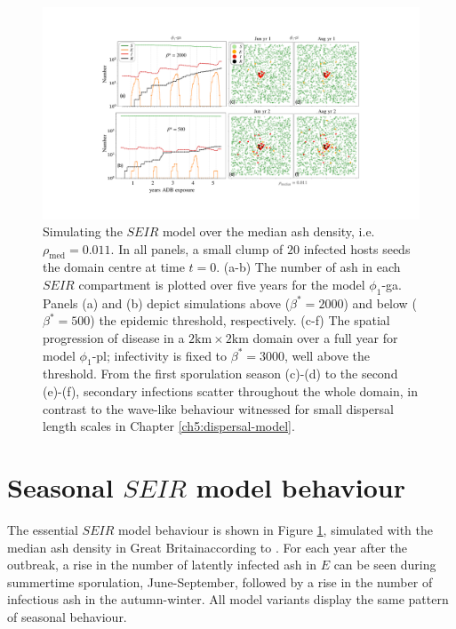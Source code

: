 \begin{landscape}
\begin{figure}
    \centering
    \includegraphics[scale=0.45]{chapter6/figures/fig4-seir.pdf} %
     \caption{Simulating the $SEIR$ model over the median ash density, i.e. $\rho_{\mathrm{med}} = 0.011$. 
     In all panels, a small clump of $20$ infected hosts seeds the domain centre at time $t=0$.
     (a-b) The number of ash in each $SEIR$ compartment is plotted over five years for the model $\phi_1$-ga.
     Panels (a) and (b) depict simulations above ($\beta^*=2000$) and below ($\beta^*=500$) the epidemic threshold, respectively. 
     (c-f) The spatial progression of disease in a $2\mathrm{km} \times 2\mathrm{km}$ domain over a full year for model $\phi_1$-pl; 
     infectivity is fixed to  $\beta^*=3000$, well above the threshold.
     From the first sporulation season (c)-(d) to the second (e)-(f), secondary infections scatter throughout the whole domain, in contrast to the wave-like behaviour witnessed for small dispersal length scales in Chapter \ref{ch5:dispersal-model}.}
    \label{fig:SEIR-spread}
\end{figure}
\end{landscape}


\section{Seasonal $SEIR$ model behaviour}
\label{sec:seir-behaviour}

The essential $SEIR$ model behaviour is shown in Figure \ref{fig:SEIR-spread}, simulated with the median ash density in Great Britain\textemdash according to \cite{hill.data}.
For each year after the outbreak, a rise in the number of latently infected ash in $E$ can be seen during summertime sporulation, June-September, followed by a rise in the number of infectious ash in the autumn-winter. 
All model variants display the same pattern of seasonal behaviour. 

